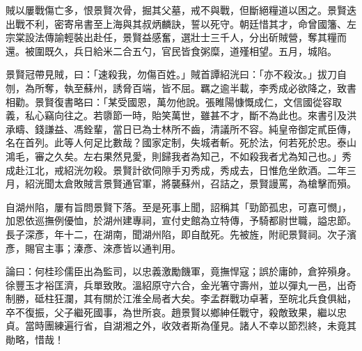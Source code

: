 \begin{pinyinscope}
賊以屢戰傷亡多，恨景賢次骨，掘其父墓，戒不與戰，但斷絕糧道以困之。景賢迭出戰不利，密寄帛書至上海與其叔炳麟訣，誓以死守。朝廷惜其才，命曾國籓、左宗棠設法傳諭輕裝出赴任，景賢益感奮，選壯士三千人，分出斫賊營，奪其糧而還。被圍既久，兵日給米二合五勺，官民皆食粥糜，道殣相望。五月，城陷。

景賢冠帶見賊，曰：「速殺我，勿傷百姓。」賊首譚紹洸曰：「亦不殺汝。」拔刀自刎，為所奪，執至蘇州，誘脅百端，皆不屈。羈之逾半載，李秀成必欲降之，致書相勸。景賢復書略曰：「某受國恩，萬勿他說。張睢陽慷慨成仁，文信國從容取義，私心竊向往之。若隳節一時，貽笑萬世，雖甚不才，斷不為此也。來書引及洪承疇、錢謙益、馮銓輩，當日已為士林所不齒，清議所不容。純皇帝御定貳臣傳，名在首列。此等人何足比數哉？國家定制，失城者斬。死於法，何若死於忠。泰山鴻毛，審之久矣。左右果然見愛，則歸我者為知己，不如殺我者尤為知己也。」秀成赴江北，戒紹洸勿殺。景賢計欲伺隙手刃秀成，秀成去，日惟危坐飲酒。二年三月，紹洸聞太倉敗賊言景賢通官軍，將襲蘇州，召詰之，景賢謾罵，為槍擊而殞。

自湖州陷，屢有旨問景賢下落。至是死事上聞，詔稱其「勁節孤忠，可嘉可憫」，加恩依巡撫例優恤，於湖州建專祠，宣付史館為立特傳，予騎都尉世職，謚忠節。長子深彥，年十二，在湖南，聞湖州陷，即自酖死。先被旌，附祀景賢祠。次子濱彥，賜官主事；溱彥、淶彥皆以通判用。

論曰：何桂珍儒臣出為監司，以忠義激勵饑軍，竟撫悍寇；誤於庸帥，倉猝殞身。徐豐玉才裕匡濟，兵單致敗。溫紹原守六合，金光箸守壽州，並以彈丸一邑，出奇制勝，砥柱狂瀾，其有關於江淮全局者大矣。李孟群戰功卓著，至皖北兵食俱絀，卒不復振，父子繼死國事，為世所哀。趙景賢以鄉紳任戰守，殺敵致果，繼以忠貞。當時團練遍行省，自湖湘之外，收效者斯為僅見。諸人不幸以節烈終，未竟其勛略，惜哉！


\end{pinyinscope}